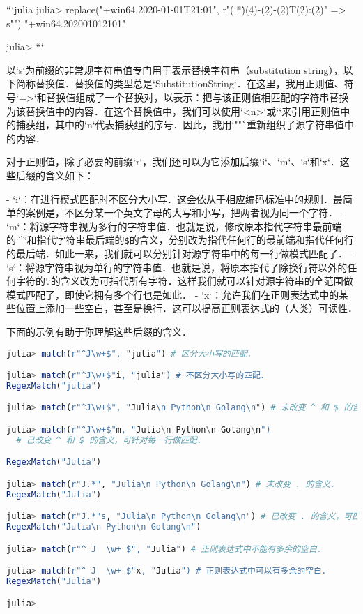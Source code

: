 ```julia
julia> replace("+win64.2020-01-01T21:01", r"(.*\.)(\d{4})-(\d{2})-(\d{2})T(\d{2}):(\d{2})" => s"\1\2\3\4\5\6")
"+win64.202001012101"

julia> 
```

以`s`为前缀的非常规字符串值专门用于表示替换字符串（substitution string），以下简称替换值．替换值的类型总是`SubstitutionString`．在这里，我用正则值、符号`=>`和替换值组成了一个替换对，以表示：把与该正则值相匹配的字符串替换为该替换值中的内容．在这个替换值中，我们可以使用`\g<n>`或`\n`来引用正则值中的捕获组，其中的`n`代表捕获组的序号．因此，我用`"\1\2\3\4\5\6"`重新组织了源字符串值中的内容．

对于正则值，除了必要的前缀`r`，我们还可以为它添加后缀`i`、`m`、`s`和`x`．这些后缀的含义如下：

- `i`：在进行模式匹配时不区分大小写．这会依从于相应编码标准中的规则．最简单的案例是，不区分某一个英文字母的大写和小写，把两者视为同一个字符．
- `m`：将源字符串视为多行的字符串值．也就是说，修改原本指代字符串最前端的`^`和指代字符串最后端的\verb|$|的含义，分别改为指代任何行的最前端和指代任何行的最后端．如此一来，我们就可以分别针对源字符串中的每一行做模式匹配了．
- `s`：将源字符串视为单行的字符串值．也就是说，将原本指代了除换行符以外的任何字符的`.`的含义改为可指代所有字符．这样我们就可以针对源字符串的全范围做模式匹配了，即使它拥有多个行也是如此．
- `x`：允许我们在正则表达式中的某些位置上添加一些空白，甚至是换行．这可以提高正则表达式的（人类）可读性．

下面的示例有助于你理解这些后缀的含义．
\begin{lstlisting}[language=julia]
julia> match(r"^J\w+$", "julia") # 区分大小写的匹配．

julia> match(r"^J\w+$"i, "julia") # 不区分大小写的匹配．
RegexMatch("julia")

julia> match(r"^J\w+$", "Julia\n Python\n Golang\n") # 未改变 ^ 和 $ 的含义．

julia> match(r"^J\w+$"m, "Julia\n Python\n Golang\n") 
  # 已改变 ^ 和 $ 的含义，可针对每一行做匹配．

RegexMatch("Julia")

julia> match(r"J.*", "Julia\n Python\n Golang\n") # 未改变 . 的含义．
RegexMatch("Julia")

julia> match(r"J.*"s, "Julia\n Python\n Golang\n") # 已改变 . 的含义，可匹配换行．
RegexMatch("Julia\n Python\n Golang\n")

julia> match(r"^ J  \w+ $", "Julia") # 正则表达式中不能有多余的空白．

julia> match(r"^ J  \w+ $"x, "Julia") # 正则表达式中可以有多余的空白．
RegexMatch("Julia")

julia> 
\end{lstlisting}

